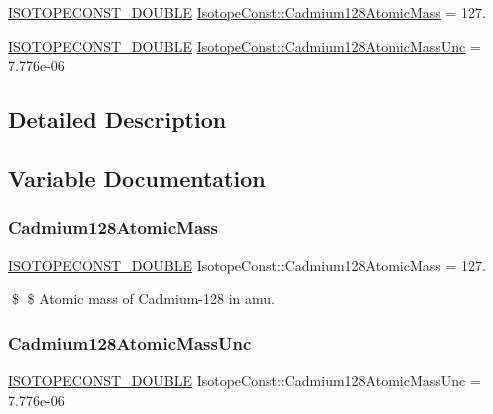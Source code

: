 \begin{DoxyCompactItemize}
\item 
\mbox{\hyperlink{group___isotope_const-_macros_ga8f45a7272ce02c0b4c65c44636ed719a}{I\+S\+O\+T\+O\+P\+E\+C\+O\+N\+S\+T\+\_\+\+D\+O\+U\+B\+LE}} \mbox{\hyperlink{group___isotope_const-_cadmium-_cd128_ga7af5af5f1e42535503e59dded0d5c252}{Isotope\+Const\+::\+Cadmium128\+Atomic\+Mass}} = 127.
\item 
\mbox{\hyperlink{group___isotope_const-_macros_ga8f45a7272ce02c0b4c65c44636ed719a}{I\+S\+O\+T\+O\+P\+E\+C\+O\+N\+S\+T\+\_\+\+D\+O\+U\+B\+LE}} \mbox{\hyperlink{group___isotope_const-_cadmium-_cd128_ga94dfafcb82a8a3eeb08dc2771b65b63e}{Isotope\+Const\+::\+Cadmium128\+Atomic\+Mass\+Unc}} = 7.\+776e-\/06
\end{DoxyCompactItemize}


\subsection{Detailed Description}


\subsection{Variable Documentation}
\mbox{\label{group___isotope_const-_cadmium-_cd128_ga7af5af5f1e42535503e59dded0d5c252}} 
\subsubsection{\texorpdfstring{Cadmium128\+Atomic\+Mass}{Cadmium128AtomicMass}}
{\footnotesize\ttfamily \mbox{\hyperlink{group___isotope_const-_macros_ga8f45a7272ce02c0b4c65c44636ed719a}{I\+S\+O\+T\+O\+P\+E\+C\+O\+N\+S\+T\+\_\+\+D\+O\+U\+B\+LE}} Isotope\+Const\+::\+Cadmium128\+Atomic\+Mass = 127.}

\$ \$ Atomic mass of Cadmium-\/128 in amu. \mbox{\label{group___isotope_const-_cadmium-_cd128_ga94dfafcb82a8a3eeb08dc2771b65b63e}} 
\subsubsection{\texorpdfstring{Cadmium128\+Atomic\+Mass\+Unc}{Cadmium128AtomicMassUnc}}
{\footnotesize\ttfamily \mbox{\hyperlink{group___isotope_const-_macros_ga8f45a7272ce02c0b4c65c44636ed719a}{I\+S\+O\+T\+O\+P\+E\+C\+O\+N\+S\+T\+\_\+\+D\+O\+U\+B\+LE}} Isotope\+Const\+::\+Cadmium128\+Atomic\+Mass\+Unc = 7.\+776e-\/06}

